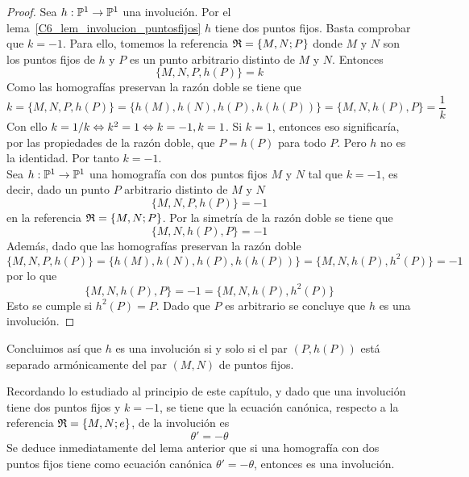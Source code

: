 \begin{proof}
	\bla \quad Sea $h:\mathbb{P}^1\rightarrow \mathbb{P}^1$ una involución. Por el lema~\ref{C6_lem_involucion_puntosfijos} $h$ tiene dos puntos fijos. Basta comprobar que $k=-1$. Para ello, tomemos la referencia $\mathfrak{R}=\{M,N;P\}$ donde $M$ y $N$ son los puntos fijos de $h$ y $P$  es un punto arbitrario distinto de $M$ y $N$. Entonces
	\begin{equation*}
		\{M,N,P,h(P)\}=k
	\end{equation*}
	Como las homografías preservan la razón doble se tiene que 
	\begin{equation*}
		k=\{M,N,P,h(P)\}=\{h(M),h(N),h(P),h(h(P))\}=\{M,N,h(P),P\}=\frac{1}{k}
	\end{equation*}
	Con ello $k=1/k\Leftrightarrow k^2=1\Leftrightarrow k=-1,k=1$. Si $k=1$, entonces eso significaría, por las propiedades de la razón doble, que $P=h(P)$ para todo $P$. Pero $h$ no es la identidad. Por tanto $k=-1$.\\
	
	\bra \quad Sea $h:\mathbb{P}^1\rightarrow \mathbb{P}^1$ una homografía con dos puntos fijos $M$ y $N$ tal que $k=-1$, es decir, dado un punto $P$ arbitrario distinto de $M$ y $N$ 
	\begin{equation*}
		\{M,N,P,h(P)\}=-1
	\end{equation*}
	en la referencia $\mathfrak{R}=\{M,N;P\}$. Por la simetría de la razón doble se tiene que
	\begin{equation*}
		\{M,N,h(P),P\}=-1
	\end{equation*}
	Además, dado que las homografías preservan la razón doble
	\begin{equation*}
		\{M,N,P,h(P)\}=\{h(M),h(N),h(P),h(h(P))\}=\{M,N,h(P),h^2(P)\}=-1
	\end{equation*}
	por lo que 
	\begin{equation*}
		\{M,N,h(P),P\}=-1=\{M,N,h(P),h^2(P)\}
	\end{equation*}
	Esto se cumple si $h^2(P)=P$. Dado que $P$ es arbitrario se concluye que $h$ es una involución.
\end{proof}

Concluimos así que $h$ es una involución si y solo si el par $(P,h(P))$ está separado armónicamente del par $(M,N)$ de puntos fijos.

Recordando lo estudiado al principio de este capítulo, y dado que una involución tiene dos puntos fijos y $k=-1$, se tiene que la ecuación canónica, respecto a la referencia $\mathfrak{R}=\{M,N;e\}$, de la involución es
\begin{equation}
	\theta'=-\theta
\end{equation}
Se deduce inmediatamente del lema anterior que si una homografía con dos puntos fijos tiene como ecuación canónica $\theta'=-\theta$, entonces es una involución.\\

